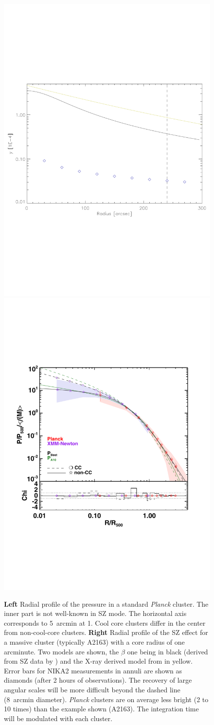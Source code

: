 \documentclass[11pt,a4paper,twoside,graphicx,color]{article}
\begin{document}
\begin{figure}
  \begin{center}
   \includegraphics[width=0.45\columnwidth]{./Figures/Arsenal_SZprofile.pdf}
   \includegraphics[width=0.45\columnwidth]{./Figures/PressureProfilePlanckXMM.pdf}
  \end{center}
  \caption{{\bf Left} Radial profile of the pressure in a standard
    {\sl Planck} cluster. The inner part is not well-known in SZ
    mode. The horizontal axis corresponds to 5~arcmin at 1. Cool core
    clusters differ in the center from non-cool-core clusters.  {\bf
      Right} Radial profile of the SZ effect for a massive cluster
    (typically A2163) with a core radius of one arcminute. Two models
    are shown, the $\beta$ one being in black (derived from SZ data by
    \cite{Reese2002}) and the X-ray derived model from
    \cite{Arnaud2010} in yellow. Error bars for NIKA2 measurements in
    annuli are shown as diamonds (after 2 hours of observations). The
    recovery of large angular scales will be more difficult beyond the
    dashed line (8~arcmin diameter). {\sl Planck} clusters are on
    average less bright (2 to 10 times) than the example shown
    (A2163). The integration time will be modulated with each
    cluster.}
  
\label{Fig:SZprofile}
\end{figure}
   
\end{document}
